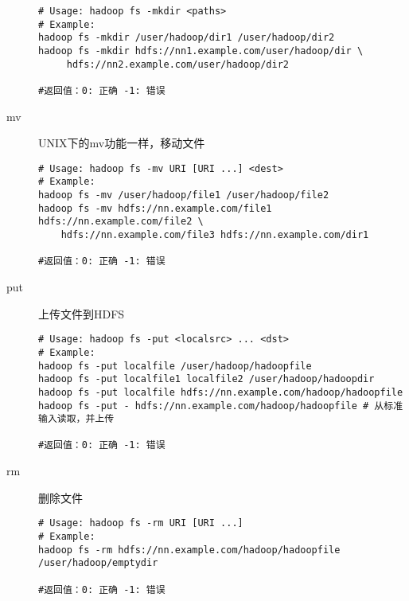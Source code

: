 \documentclass{article}
\begin{document}
\begin{description}
\begin{verbatim}
# Usage: hadoop fs -mkdir <paths>
# Example:
hadoop fs -mkdir /user/hadoop/dir1 /user/hadoop/dir2
hadoop fs -mkdir hdfs://nn1.example.com/user/hadoop/dir \
	 hdfs://nn2.example.com/user/hadoop/dir2

#返回值：0: 正确 -1: 错误
\end{verbatim}

\item[mv] UNIX下的mv功能一样，移动文件

\begin{verbatim}
# Usage: hadoop fs -mv URI [URI ...] <dest>
# Example:
hadoop fs -mv /user/hadoop/file1 /user/hadoop/file2
hadoop fs -mv hdfs://nn.example.com/file1 hdfs://nn.example.com/file2 \
	hdfs://nn.example.com/file3 hdfs://nn.example.com/dir1

#返回值：0: 正确 -1: 错误
\end{verbatim}

\item[put] 上传文件到HDFS

\begin{verbatim}
# Usage: hadoop fs -put <localsrc> ... <dst>
# Example:
hadoop fs -put localfile /user/hadoop/hadoopfile
hadoop fs -put localfile1 localfile2 /user/hadoop/hadoopdir
hadoop fs -put localfile hdfs://nn.example.com/hadoop/hadoopfile
hadoop fs -put - hdfs://nn.example.com/hadoop/hadoopfile # 从标准输入读取，并上传

#返回值：0: 正确 -1: 错误
\end{verbatim}

\item[rm] 删除文件

\begin{verbatim}
# Usage: hadoop fs -rm URI [URI ...]
# Example:
hadoop fs -rm hdfs://nn.example.com/hadoop/hadoopfile /user/hadoop/emptydir

#返回值：0: 正确 -1: 错误
\end{verbatim}


\end{description}
\end{document}
